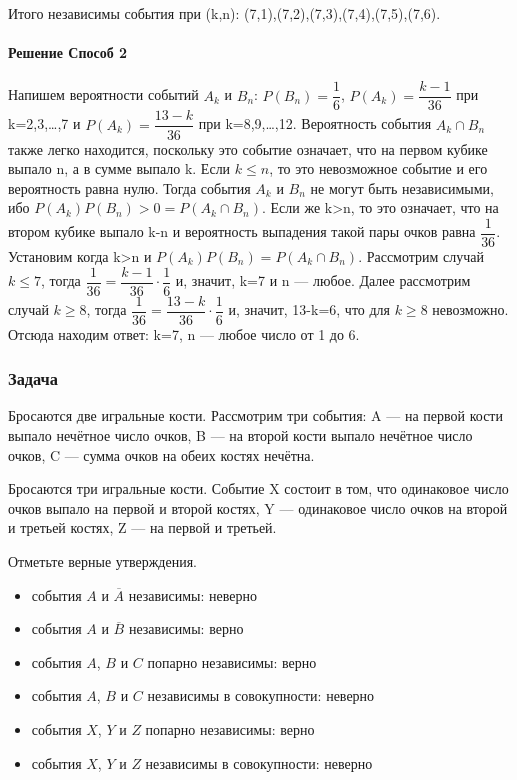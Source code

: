 \documentclass[a4paper,12pt]{article}
\begin{document}
Итого независимы события при (k,n): (7,1),(7,2),(7,3),(7,4),(7,5),(7,6).

\paragraph{Решение Способ 2} 
Напишем вероятности событий \(A_k\) и \(B_n\): \(P(B_n)= \dfrac{1}{6}\), \(P(A_k)=\dfrac{k-1}{36}\) при k=2,3,…,7 и \(P(A_k)=\dfrac{13-k}{36}\) при k=8,9,…,12. Вероятность события \(A_k \cap B_n\) также легко находится, поскольку это событие означает, что на первом кубике выпало n, а в сумме выпало k. Если \(k \leqslant n\), то это невозможное событие и его вероятность равна нулю. Тогда события \(A_k\) и \(B_n\) не могут быть независимыми, ибо \(P(A_k)P(B_n) > 0=P(A_k \cap B_n)\). Если же k>n, то это означает, что на втором кубике выпало k-n и вероятность выпадения такой пары очков равна \(\dfrac{1}{36}\). Установим когда k>n и \(P(A_k)P(B_n)=P(A_k \cap B_n)\). Рассмотрим случай \(k \leqslant 7\), тогда \(\dfrac{1}{36}=\dfrac{k-1}{36} \cdot \dfrac{1}{6}\) и, значит, k=7 и n — любое. Далее рассмотрим случай \(k \geqslant 8\), тогда \(\dfrac{1}{36}=\dfrac{13-k}{36} \cdot \dfrac{1}{6}\) и, значит, 13-k=6, что для \(k \geqslant 8\) невозможно. Отсюда находим ответ: k=7, n — любое число от 1 до 6.

\subsubsection*{Задача}
Бросаются две игральные кости. Рассмотрим три события: A — на первой кости выпало нечётное число очков, B — на второй кости выпало нечётное число очков, C — сумма очков на обеих костях нечётна. 

Бросаются три игральные кости. Событие X
состоит в том, что одинаковое число очков выпало на первой и второй костях, Y — одинаковое число очков на второй и третьей костях, Z — на первой и третьей.

Отметьте верные утверждения.
\begin{itemize}
    \item события \(A\) и \(\overline{A}\) независимы: неверно
    \item события \(A\) и \(\overline{B}\) независимы: верно 
    \item события \(A\),  \(B\) и \(C\) попарно независимы: верно
    \item события \(A\),  \(B\) и \(C\) независимы в совокупности: неверно 
    \item события \(X\),  \(Y\) и \(Z\) попарно независимы: верно 
    \item события \(X\),  \(Y\) и \(Z\) независимы в совокупности: неверно  
\end{itemize}
\end{document}
